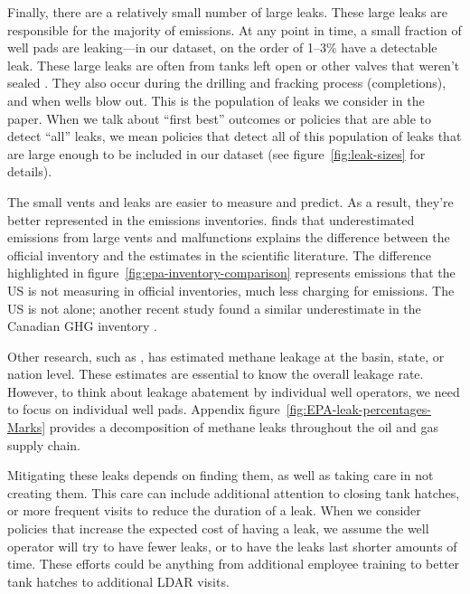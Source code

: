 \documentclass[12pt,oneside,letterpaper]{article}
\theoremstyle{definition}
\begin{document}
\begin{refsection}
Finally, there are a relatively small number of large leaks.
These large leaks are responsible for the majority of emissions.
At any point in time, a small fraction of well pads are leaking---in our dataset, on the order of 1--3\% have a detectable leak.
These large leaks are often from tanks left open or other valves that weren't sealed
\parencite{Lyon/Alvarez/Zavala-Araiza/Brandt/Jackson/Hamburg:2016}.
They also occur during the drilling and fracking process (completions), and when wells blow out.
This is the population of leaks we consider in the paper.
When we talk about ``first best'' outcomes or policies that are able to detect ``all'' leaks, we mean policies that detect all of this population of leaks that are large enough to be included in our dataset (see figure~\ref{fig:leak-sizes} for details).

The small vents and leaks are easier to measure and predict.
As a result, they're better represented in the emissions inventories.
\textcite{Rutherford/etal:2021} finds that underestimated emissions from large vents and malfunctions explains the difference between the official inventory and the estimates in the scientific literature.
The difference highlighted in figure~\ref{fig:epa-inventory-comparison}  represents emissions that the US is not measuring in official inventories, much less charging for emissions.
The US is not alone; another recent study found a similar underestimate in the Canadian \gls{GHG} inventory \parencite{Chan/Worthy/Chan/Ishizawa/Moran/Delcloo/Vogel:2020}.


Other research, such as \textcite{Alvarez/etal:2018}, has estimated methane leakage at the basin, state, or nation level.
These estimates are essential to know the overall leakage rate.
However, to think about leakage abatement by individual well operators, we need to focus on individual well pads.
Appendix figure~\ref{fig:EPA-leak-percentages-Marks} provides a decomposition of methane leaks throughout the oil and gas supply chain.

Mitigating these leaks depends on finding them, as well as taking care in not creating them.
This care can include additional attention to closing tank hatches, or more frequent visits to reduce the duration of a leak.
When we consider policies that increase the expected cost of having a leak, we assume the well operator will try to have fewer leaks, or to have the leaks last shorter amounts of time.
These efforts could be anything from additional employee training to better tank hatches to additional \gls{LDAR} visits.


\end{refsection}
\end{document}
